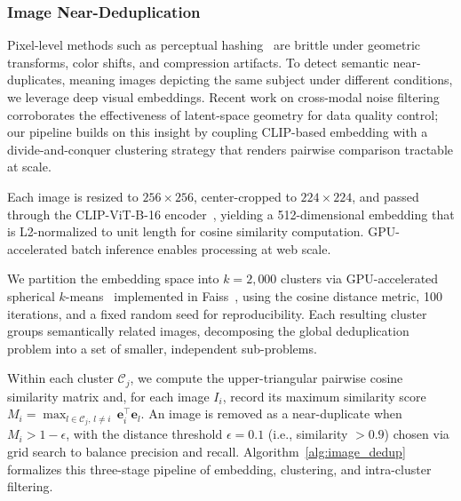 \documentclass[sigconf, nonacm]{acmart}
\begin{document}
\subsubsection{Image Near-Deduplication}

Pixel-level methods such as perceptual hashing~\cite{jain2023deep} are brittle under geometric transforms, color shifts, and compression artifacts. To detect semantic near-duplicates, meaning images depicting the same subject under different conditions, we leverage deep visual embeddings.
Recent work on cross-modal noise filtering~\cite{chen2025syntheclean} corroborates the effectiveness of latent-space geometry for data quality control; our pipeline builds on this insight by coupling CLIP-based embedding with a divide-and-conquer clustering strategy that renders pairwise comparison tractable at scale.

Each image is resized to $256 \times 256$, center-cropped to $224 \times 224$, and passed through the CLIP-ViT-B-16 encoder~\cite{radford2021learning}, yielding a 512-dimensional embedding that is L2-normalized to unit length for cosine similarity computation. GPU-accelerated batch inference enables processing at web scale.

We partition the embedding space into $k{=}2{,}000$ clusters via GPU-accelerated spherical $k$-means~\cite{dhillon2001concept} implemented in Faiss~\cite{douze2017faiss}, using the cosine distance metric, 100 iterations, and a fixed random seed for reproducibility. Each resulting cluster groups semantically related images, decomposing the global deduplication problem into a set of smaller, independent sub-problems.

Within each cluster $\mathcal{C}_j$, we compute the upper-triangular pairwise cosine similarity matrix and, for each image $I_i$, record its maximum similarity score $M_i = \max_{l \in \mathcal{C}_j,\, l \neq i}\, \mathbf{e}_i^\top \mathbf{e}_l$. An image is removed as a near-duplicate when $M_i > 1 - \epsilon$, with the distance threshold $\epsilon = 0.1$ (i.e., similarity $> 0.9$) chosen via grid search to balance precision and recall. Algorithm~\ref{alg:image_dedup} formalizes this three-stage pipeline of embedding, clustering, and intra-cluster filtering.
\end{document}
